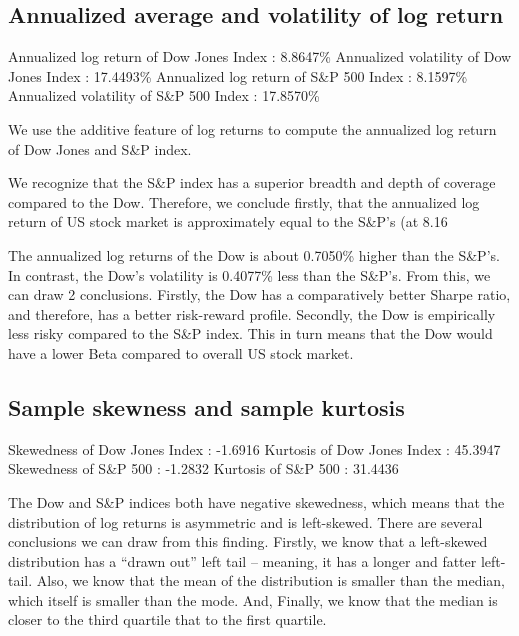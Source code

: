 \documentclass[a4paper]{article}
\begin{document}
\subsection{Annualized average and volatility of log return}
\begin{flushleft}
Annualized log return of Dow Jones Index : 8.8647\% \linebreak 
Annualized volatility of Dow Jones Index : 17.4493\% \linebreak 
Annualized log return of S\&P 500 Index : 8.1597\% \linebreak 
Annualized volatility of S\&P 500 Index : 17.8570\% \linebreak 
\end{flushleft}
\vspace{-5mm}
We use the additive feature of log returns to compute the annualized log return of Dow Jones and S\&P index. 

We recognize that the S\&P index has a superior breadth and depth of coverage compared to the Dow. Therefore, we conclude firstly, that the annualized log return of US stock market is approximately equal to the S\&P’s (at 8.16%

The annualized log returns of the Dow is about 0.7050\% higher than the S\&P’s. In contrast, the Dow’s volatility is 0.4077\% less than the S\&P’s. From this, we can draw 2 conclusions. Firstly, the Dow has a comparatively better Sharpe ratio, and therefore, has a better risk-reward profile. Secondly, the Dow is empirically less risky compared to the S\&P index. This in turn means that the Dow would have a lower Beta compared to overall US stock market.


\subsection{Sample skewness and sample kurtosis}
\begin{flushleft}
Skewedness of Dow Jones Index : -1.6916 \linebreak
Kurtosis of Dow Jones Index : 45.3947 \linebreak
Skewedness of S\&P 500 : -1.2832 \linebreak
Kurtosis of S\&P 500 : 31.4436 \linebreak
\end{flushleft}
\vspace{-5mm}
The Dow and S\&P indices both have negative skewedness, which means that the distribution of log returns is asymmetric and is left-skewed. There are several conclusions we can draw from this finding. Firstly, we know that a left-skewed distribution has a “drawn out” left tail – meaning, it has a longer and fatter left-tail. Also, we know that the mean of the distribution is smaller than the median, which itself is smaller than the mode. And, Finally, we know that the median is closer to the third quartile that to the first quartile. 
\end{document}

